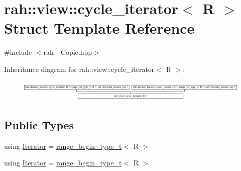 \hypertarget{structrah_1_1view_1_1cycle__iterator}{}\section{rah\+::view\+::cycle\+\_\+iterator$<$ R $>$ Struct Template Reference}
\label{structrah_1_1view_1_1cycle__iterator}


{\ttfamily \#include $<$rah -\/ Copie.\+hpp$>$}

Inheritance diagram for rah\+::view\+::cycle\+\_\+iterator$<$ R $>$\+:\begin{figure}[H]
\begin{center}
\leavevmode
\includegraphics[height=1.010830cm]{structrah_1_1view_1_1cycle__iterator}
\end{center}
\end{figure}
\subsection*{Public Types}
\begin{DoxyCompactItemize}
\item 
using \mbox{\hyperlink{structrah_1_1view_1_1cycle__iterator_ac9761016862e6bb26b0ca5e923344b83}{Iterator}} = \mbox{\hyperlink{namespacerah_a28aff4eeddcece6be65ff0b956d32d4a}{range\+\_\+begin\+\_\+type\+\_\+t}}$<$ R $>$
\item 
using \mbox{\hyperlink{structrah_1_1view_1_1cycle__iterator_ac9761016862e6bb26b0ca5e923344b83}{Iterator}} = \mbox{\hyperlink{namespacerah_a28aff4eeddcece6be65ff0b956d32d4a}{range\+\_\+begin\+\_\+type\+\_\+t}}$<$ R $>$
\end{DoxyCompactItemize}
